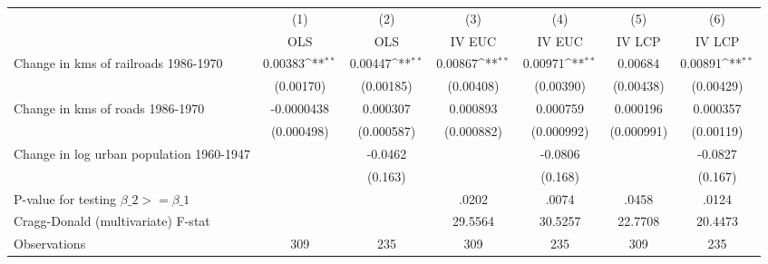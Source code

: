 {
\def\sym#1{\ifmmode^{#1}\else\(^{#1}\)\fi}
\begin{tabular}{l*{6}{c}}
\hline\hline
                &\multicolumn{1}{c}{(1)}&\multicolumn{1}{c}{(2)}&\multicolumn{1}{c}{(3)}&\multicolumn{1}{c}{(4)}&\multicolumn{1}{c}{(5)}&\multicolumn{1}{c}{(6)}\\
                &\multicolumn{1}{c}{OLS}&\multicolumn{1}{c}{OLS}&\multicolumn{1}{c}{IV EUC}&\multicolumn{1}{c}{IV EUC}&\multicolumn{1}{c}{IV LCP}&\multicolumn{1}{c}{IV LCP}\\
\hline
Change in kms of railroads 1986-1970&  0.00383\sym{**} &  0.00447\sym{**} &  0.00867\sym{**} &  0.00971\sym{**} &  0.00684         &  0.00891\sym{**} \\
                &(0.00170)         &(0.00185)         &(0.00408)         &(0.00390)         &(0.00438)         &(0.00429)         \\
[1em]
Change in kms of roads 1986-1970&-0.0000438         & 0.000307         & 0.000893         & 0.000759         & 0.000196         & 0.000357         \\
                &(0.000498)         &(0.000587)         &(0.000882)         &(0.000992)         &(0.000991)         &(0.00119)         \\
[1em]
Change in log urban population 1960-1947&                  &  -0.0462         &                  &  -0.0806         &                  &  -0.0827         \\
                &                  &  (0.163)         &                  &  (0.168)         &                  &  (0.167)         \\
\hline
P-value for testing $\beta\_{2} >= \beta\_{1}$&                  &                  &    .0202         &    .0074         &    .0458         &    .0124         \\
Cragg-Donald (multivariate) F-stat&                  &                  &  29.5564         &  30.5257         &  22.7708         &  20.4473         \\
Observations    &      309         &      235         &      309         &      235         &      309         &      235         \\
\hline\hline
\end{tabular}
}
